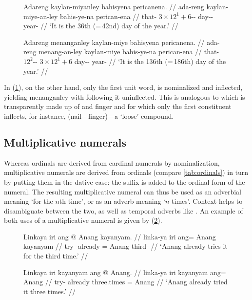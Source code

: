 \begin{figure}[h]
\pex
\a\label{ex:ordtightcomp}\begingl
	\gla Adareng kaylan-miyanley bahisyena pericanena. //
	\glb ada-reng kaylan-miye-an-ley bahis-ye-na perican-ena //
	\glc that-\AargI{} {$3 \times 12^1 + 6$-\Nmlz{}-\PargI{}} 
		day-\Pl{}-\Gen{} year-\Gen{} //
	\glft `It is the 36th (=\,42nd) day of the year.' //
\endgl

\a\label{ex:ordloosecomp}\begingl
	\gla Adareng menanganley kaylan-miye bahisyena pericanena. //
	\glb ada-reng menang-an-ley kaylan-miye bahis-ye-na perican-ena //
	\glc that-\AargI{} {$12^2$-\Nmlz{}-\PargI{}} {$3 \times 12^1 
		+ 6$} day-\Pl{}-\Gen{} year-\Gen{} //
	\glft `It is the 136th (=\,186th) day of the year.' //
\endgl
\xe
\end{figure}

In (\ref{ex:ordloosecomp}), on the other hand, only the first unit word,
 is nominalized and inflected, yielding 
{menanganley} with  following it uninflected.
This is analogous to  which is
transparently made up of  and 
{finger} and for which only the first constituent inflects, for instance,
 (nail-\Pl{}-\Gen{}
finger)---a `loose' compound.


\subsection{Multiplicative numerals}

Whereas ordinals are derived from cardinal numerals by nominalization,
multiplicative numerals are derived from ordinals (compare
\autoref{tab:ordinals}) in turn by putting them in the dative case: the suffix
 is added to the ordinal form of the numeral. The resulting
multiplicative numeral can thus be used as an adverbial meaning `for the $n$th
time', or as an adverb meaning `$n$ times'. Context helps to disambiguate
between the two, as well as temporal adverbs like . An
example of both uses of a multiplicative numeral is given by 
(\ref{ex:multnumwo}).

\begin{figure}[h]
\pex\label{ex:multnumwo}
\a\begingl
	\gla Linkaya iri ang @ Anang kayanyam. //
	\glb linka-ya iri ang= Anang kayanyam //
	\glc try-\TsgM{} already \Aarg{}= Anang third-\Dat{} //
	\glft `Anang already tries it for the third time.' //
\endgl

\a\begingl
	\gla Linkaya iri kayanyam ang @ Anang. //
	\glb linka-ya iri kayanyam ang= Anang //
	\glc try-\TsgM{} already three.times \Aarg{}= Anang //
	\glft `Anang already tried it three times.' //
\endgl
\xe
\end{figure}

